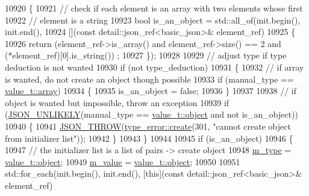 \begin{DoxyCode}
10920     \{
10921         \textcolor{comment}{// check if each element is an array with two elements whose first}
10922         \textcolor{comment}{// element is a string}
10923         \textcolor{keywordtype}{bool} is\_an\_object = std::all\_of(init.begin(), init.end(),
10924                                         [](\textcolor{keyword}{const} detail::json\_ref<basic\_json>& element\_ref)
10925         \{
10926             \textcolor{keywordflow}{return} (element\_ref->is\_array() and element\_ref->size() == 2 and (*element\_ref)[0].is\_string())
      ;
10927         \});
10928 
10929         \textcolor{comment}{// adjust type if type deduction is not wanted}
10930         \textcolor{keywordflow}{if} (not type\_deduction)
10931         \{
10932             \textcolor{comment}{// if array is wanted, do not create an object though possible}
10933             \textcolor{keywordflow}{if} (manual\_type == \hyperlink{namespacenlohmann_1_1detail_a1ed8fc6239da25abcaf681d30ace4985af1f713c9e000f5d3f280adbd124df4f5}{value\_t::array})
10934             \{
10935                 is\_an\_object = \textcolor{keyword}{false};
10936             \}
10937 
10938             \textcolor{comment}{// if object is wanted but impossible, throw an exception}
10939             \textcolor{keywordflow}{if} (\hyperlink{json_8hpp_ab77582407c64944e7db1ea95ab520253}{JSON\_UNLIKELY}(manual\_type == \hyperlink{namespacenlohmann_1_1detail_a1ed8fc6239da25abcaf681d30ace4985aa8cfde6331bd59eb2ac96f8911c4b666}{value\_t::object} and not 
      is\_an\_object))
10940             \{
10941                 \hyperlink{json_8hpp_a6c274f6db2e65c1b66c7d41b06ad690f}{JSON\_THROW}(\hyperlink{classnlohmann_1_1detail_1_1type__error_aecc083aea4b698c33d042670ba50c10f}{type\_error::create}(301, \textcolor{stringliteral}{"cannot create object from
       initializer list"}));
10942             \}
10943         \}
10944 
10945         \textcolor{keywordflow}{if} (is\_an\_object)
10946         \{
10947             \textcolor{comment}{// the initializer list is a list of pairs -> create object}
10948             \hyperlink{classnlohmann_1_1basic__json_a91990b60d7d4d67968a2c1db677536e7}{m\_type} = \hyperlink{namespacenlohmann_1_1detail_a1ed8fc6239da25abcaf681d30ace4985aa8cfde6331bd59eb2ac96f8911c4b666}{value\_t::object};
10949             \hyperlink{classnlohmann_1_1basic__json_aeb0814f76966f99290cb29e127c90a77}{m\_value} = \hyperlink{namespacenlohmann_1_1detail_a1ed8fc6239da25abcaf681d30ace4985aa8cfde6331bd59eb2ac96f8911c4b666}{value\_t::object};
10950 
10951             std::for\_each(init.begin(), init.end(), [\textcolor{keyword}{this}](\textcolor{keyword}{const} detail::json\_ref<basic\_json>& element\_ref)

\end{DoxyCode}
